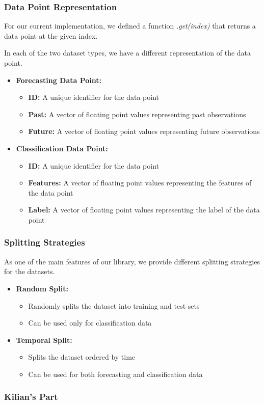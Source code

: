 \documentclass[t,english]{beamer}
\begin{document}
\begin{frame}
  \frametitle{Data Point Representation}
  For our current implementation, we defined a function \textit{.get(index)} that returns a data point at the given index.

  In each of the two dataset types, we have a different representation of the data point.
  \begin{itemize}[]
    \item \textbf{Forecasting Data Point:}
    \begin{itemize}
      \item \textbf{ID:} A unique identifier for the data point
      \item \textbf{Past:} A vector of floating point values representing past observations
      \item \textbf{Future:} A vector of floating point values representing future observations
    \end{itemize}
    \item \textbf{Classification Data Point:}
    \begin{itemize}
      \item \textbf{ID:} A unique identifier for the data point
      \item \textbf{Features:} A vector of floating point values representing the features of the data point
      \item \textbf{Label:} A vector of floating point values representing the label of the data point
    \end{itemize}
  \end{itemize}

\end{frame}

\begin{frame}
  \frametitle{Splitting Strategies}
  As one of the main features of our library, we provide different splitting strategies for the datasets.
  \begin{itemize}[]
    \item \textbf{Random Split:}
    \begin{itemize}
      \item Randomly splits the dataset into training and test sets
      \item Can be used only for classification data
    \end{itemize}
    \item \textbf{Temporal Split:}
    \begin{itemize}
      \item Splits the dataset ordered by time
      \item Can be used for both forecasting and classification data
    \end{itemize}
  \end{itemize}

\end{frame}

\begin{frame}
  \frametitle{Kilian's Part}
    
\end{frame}
\end{document}

